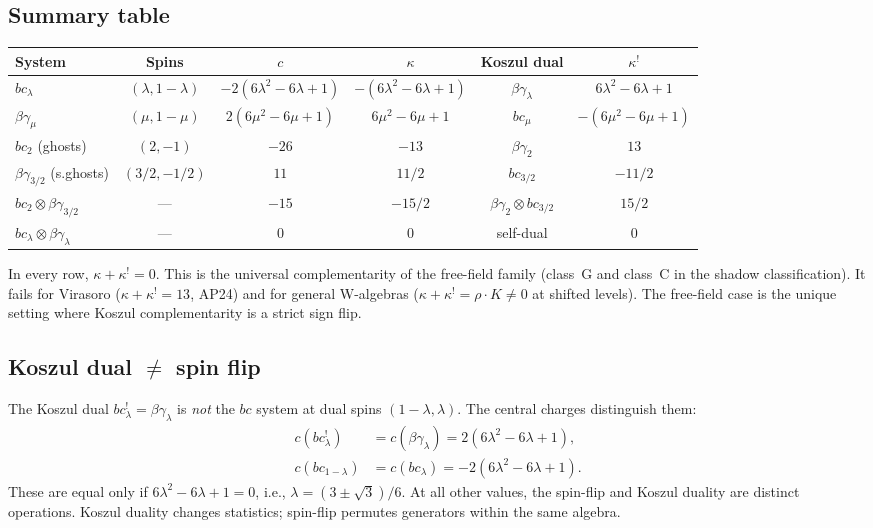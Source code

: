\documentclass[11pt]{article}
\begin{document}
\subsection{Summary table}

\begin{center}
\renewcommand{\arraystretch}{1.3}
\begin{tabular}{lccccc}
\hline
\textbf{System} & \textbf{Spins} & $c$ & $\kappa$ &
  \textbf{Koszul dual} & $\kappa^!$ \\
\hline
$bc_\lambda$ & $(\lambda, 1{-}\lambda)$ &
  $-2(6\lambda^2{-}6\lambda{+}1)$ &
  $-(6\lambda^2{-}6\lambda{+}1)$ &
  $\beta\gamma_\lambda$ &
  $6\lambda^2{-}6\lambda{+}1$ \\
$\beta\gamma_\mu$ & $(\mu, 1{-}\mu)$ &
  $2(6\mu^2{-}6\mu{+}1)$ &
  $6\mu^2{-}6\mu{+}1$ &
  $bc_\mu$ &
  $-(6\mu^2{-}6\mu{+}1)$ \\
\hline
$bc_2$ (ghosts) & $(2, -1)$ & $-26$ & $-13$ &
  $\beta\gamma_2$ & $13$ \\
$\beta\gamma_{3/2}$ (s.ghosts) & $(3/2, -1/2)$ & $11$ &
  $11/2$ & $bc_{3/2}$ & $-11/2$ \\
$bc_2 \otimes \beta\gamma_{3/2}$ & --- & $-15$ &
  $-15/2$ & $\beta\gamma_2 \otimes bc_{3/2}$ & $15/2$ \\
\hline
$bc_\lambda \otimes \beta\gamma_\lambda$ & --- & $0$ &
  $0$ & self-dual & $0$ \\
\hline
\end{tabular}
\end{center}

\begin{remark}
In every row, $\kappa + \kappa^! = 0$.  This is the universal
complementarity of the free-field family (class~G and class~C
in the shadow classification).  It fails for Virasoro
($\kappa + \kappa^! = 13$, AP24) and for general W-algebras
($\kappa + \kappa^! = \rho \cdot K \neq 0$ at shifted
levels).  The free-field case is the unique setting where
Koszul complementarity is a strict sign flip.
\end{remark}

\subsection{Koszul dual $\neq$ spin flip}

\begin{proposition}
\label{prop:bc-not-spin-flip}
The Koszul dual $bc_\lambda^! = \beta\gamma_\lambda$ is
\emph{not} the $bc$ system at dual spins $(1-\lambda, \lambda)$.
The central charges distinguish them:
\begin{align*}
c(bc_\lambda^!) &= c(\beta\gamma_\lambda)
= 2(6\lambda^2 - 6\lambda + 1), \\
c(bc_{1-\lambda}) &= c(bc_\lambda) = -2(6\lambda^2 - 6\lambda + 1).
\end{align*}
These are equal only if $6\lambda^2 - 6\lambda + 1 = 0$, i.e.,
$\lambda = (3 \pm \sqrt{3})/6$.  At all other values, the spin-flip
and Koszul duality are distinct operations.  Koszul duality changes
statistics; spin-flip permutes generators within the same algebra.
\end{proposition}
\end{document}

